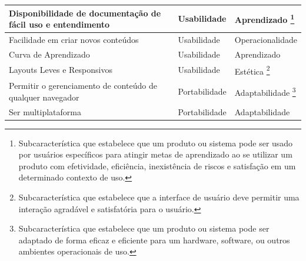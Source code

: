 \begin{longtable}{|p{140pt}|p{140pt}|p{120pt}|}
 	\hline
{\raggedright Disponibilidade de documentação de fácil uso e entendimento}
 	 & {\raggedright Usabilidade}
 	 & {\raggedright Aprendizado \footnote{Subcaracterística que estabelece que um produto ou sistema pode ser usado por usuários específicos para atingir metas de aprendizado ao se utilizar um produto com efetividade, eficiência, inexistência de riscos e satisfação em um determinado contexto de uso.} }\\
 	\hline
 	 {\raggedright Facilidade em criar novos conteúdos}
 	 & {\raggedright Usabilidade}
 	 & {\raggedright Operacionalidade}\\\hline

{\raggedright Curva de Aprendizado}
 	 & {\raggedright Usabilidade}
 	 & {\raggedright Aprendizado}\\
 	\hline
 	{\raggedright Layouts Leves e Responsivos}
 	 	 & {\raggedright Usabilidade}
 	 	 & {\raggedright Estética \footnote{Subcaracterística que estabelece que a interface de usuário deve permitir uma interação agradável e satisfatória para o usuário.}}\\
 	 	\hline
 	 {\raggedright Permitir o gerenciamento de conteúdo de qualquer navegador}
 	 & {\raggedright Portabilidade}
 	 & {\raggedright Adaptabilidade \footnote{Subcaracterística que estabelece que um produto ou sistema pode ser adaptado de forma eficaz e eficiente para um hardware, software, ou outros ambientes operacionais de uso.}}\\
 	\hline 
 	{\raggedright Ser multiplataforma}
 	 	 & {\raggedright Portabilidade}
 	 	 & {\raggedright Adaptabilidade}\\
 	 	\hline


\end{longtable}
